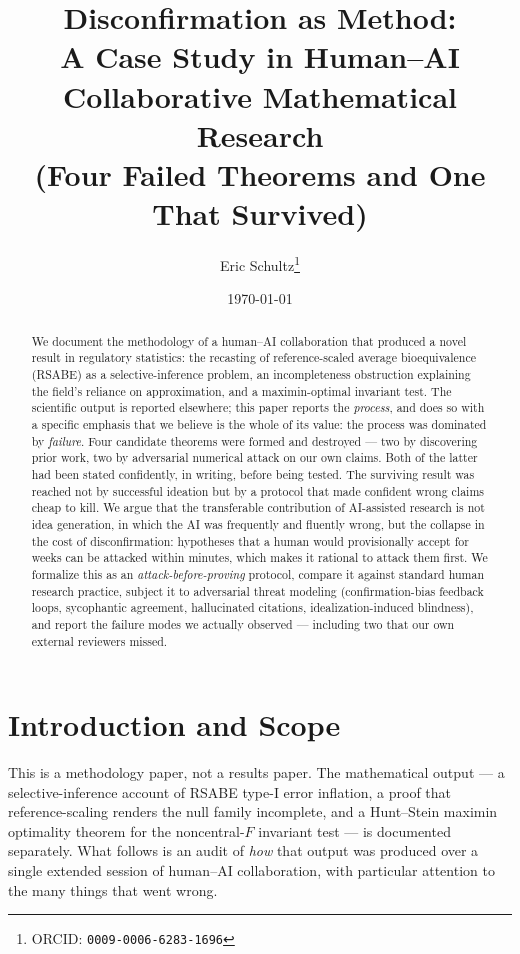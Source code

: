 \documentclass[11pt]{article}
\title{\bfseries Disconfirmation as Method:\\
A Case Study in Human--AI Collaborative Mathematical Research\\
\large (Four Failed Theorems and One That Survived)}
\author[1]{Eric Schultz\thanks{ORCID: \texttt{0009-0006-6283-1696}}}
\affil[1]{Independent Researcher}
\date{\today}
\theoremstyle{remark}
\begin{document}
\maketitle

\begin{abstract}
We document the methodology of a human--AI collaboration that produced a novel result in regulatory statistics: the recasting of reference-scaled average bioequivalence (RSABE) as a selective-inference problem, an incompleteness obstruction explaining the field's reliance on approximation, and a maximin-optimal invariant test. The scientific output is reported elsewhere; this paper reports the \emph{process}, and does so with a specific emphasis that we believe is the whole of its value: the process was dominated by \emph{failure}. Four candidate theorems were formed and destroyed --- two by discovering prior work, two by adversarial numerical attack on our own claims. Both of the latter had been stated confidently, in writing, before being tested. The surviving result was reached not by successful ideation but by a protocol that made confident wrong claims cheap to kill. We argue that the transferable contribution of AI-assisted research is not idea generation, in which the AI was frequently and fluently wrong, but the collapse in the cost of disconfirmation: hypotheses that a human would provisionally accept for weeks can be attacked within minutes, which makes it rational to attack them first. We formalize this as an \emph{attack-before-proving} protocol, compare it against standard human research practice, subject it to adversarial threat modeling (confirmation-bias feedback loops, sycophantic agreement, hallucinated citations, idealization-induced blindness), and report the failure modes we actually observed --- including two that our own external reviewers missed.
\end{abstract}

\tableofcontents

\section{Introduction and Scope}

This is a methodology paper, not a results paper. The mathematical output --- a selective-inference account of RSABE type-I error inflation, a proof that reference-scaling renders the null family incomplete, and a Hunt--Stein maximin optimality theorem for the noncentral-$F$ invariant test --- is documented separately. What follows is an audit of \emph{how} that output was produced over a single extended session of human--AI collaboration, with particular attention to the many things that went wrong.
\end{document}
